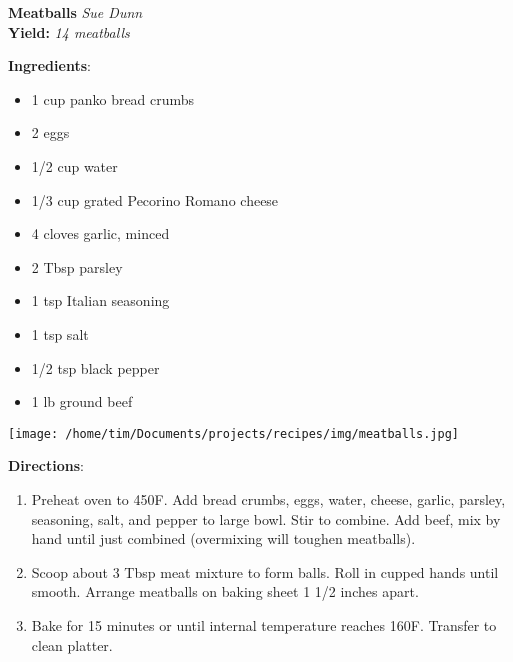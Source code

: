 \documentclass[11pt, twoside, openany]{book}
\begin{document}
\noindent\begin{minipage}[t]{\linewidth}%
{\Large\textbf{Meatballs}} \label{meatballs}\hfill\textit{Sue Dunn}\\
\textbf{Yield:} \textit{14 meatballs}\\
\noindent\begin{minipage}[t]{0.78\linewidth}%
\textbf{Ingredients}:\vspace{-3mm}
\begin{multicols}{2}
\begin{itemize}\setlength\itemsep{-1mm}
\item 1 cup panko bread crumbs
\item 2 eggs
\item 1/2 cup water
\item 1/3 cup grated Pecorino Romano cheese
\item 4 cloves garlic, minced
\item 2 Tbsp parsley
\item 1 tsp Italian seasoning
\item 1 tsp salt
\item 1/2 tsp black pepper
\item 1 lb ground beef
\end{itemize}
\end{multicols}
\end{minipage}
\noindent\begin{minipage}[t]{0.18\linewidth}
\centering \strut\vspace*{-\baselineskip}\newline
\texttt{[image: /home/tim/Documents/projects/recipes/img/meatballs.jpg]}\\
\end{minipage}\vspace{3mm}
\textbf{Directions}:
\vspace{-3mm}\begin{enumerate}\setlength\itemsep{-1mm}
\item Preheat oven to 450F. Add bread crumbs, eggs, water, cheese, garlic, parsley, seasoning, salt, and pepper to large bowl. Stir to combine. Add beef, mix by hand until just combined (overmixing will toughen meatballs).
\item Scoop about 3 Tbsp meat mixture to form balls. Roll in cupped hands until smooth. Arrange meatballs on baking sheet 1 1/2 inches apart.
\item Bake for 15 minutes or until internal temperature reaches 160F. Transfer to clean platter.
\end{enumerate}
\end{minipage}\vspace{8mm}
\end{document}
